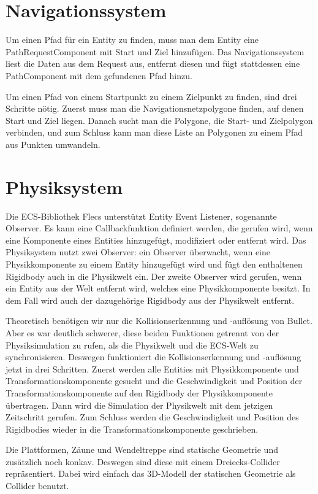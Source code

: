 \section{Navigationssystem}

Um einen Pfad für ein Entity zu finden, muss man dem Entity eine PathRequestComponent mit Start und Ziel hinzufügen. Das Navigationssystem liest die Daten aus dem Request aus, entfernt diesen und fügt stattdessen eine PathComponent mit dem gefundenen Pfad hinzu.

Um einen Pfad von einem Startpunkt zu einem Zielpunkt zu finden, sind drei Schritte nötig. Zuerst muss man die Navigationsnetzpolygone finden, auf denen Start und Ziel liegen. Danach sucht man die Polygone, die Start- und Zielpolygon verbinden, und zum Schluss kann man diese Liste an Polygonen zu einem Pfad aus Punkten umwandeln.

\section{Physiksystem}

Die ECS-Bibliothek Flecs unterstützt Entity Event Listener, sogenannte Observer. Es kann eine Callbackfunktion definiert werden, die gerufen wird, wenn eine Komponente eines Entities hinzugefügt, modifiziert oder entfernt wird. Das Physiksystem nutzt zwei Observer: ein Observer überwacht, wenn eine Physikkomponente zu einem Entity hinzugefügt wird und fügt den enthaltenen Rigidbody auch in die Physikwelt ein. Der zweite Observer wird gerufen, wenn ein Entity aus der Welt entfernt wird, welches eine Physikkomponente besitzt. In dem Fall wird auch der dazugehörige Rigidbody aus der Physikwelt entfernt.

Theoretisch benötigen wir nur die Kollisionserkennung und -auflösung von Bullet. Aber es war deutlich schwerer, diese beiden Funktionen getrennt von der Physiksimulation zu rufen, als die Physikwelt und die ECS-Welt zu synchronisieren. Deswegen funktioniert die Kollisionserkennung und -auflösung jetzt in drei Schritten. Zuerst werden alle Entities mit Physikkomponente und Transformationskomponente gesucht und die Geschwindigkeit und Position der Transformationskomponente auf den Rigidbody der Physikkomponente übertragen. Dann wird die Simulation der Physikwelt mit dem jetzigen Zeitschritt gerufen. Zum Schluss werden die Geschwindigkeit und Position des Rigidbodies wieder in die Transformationskomponente geschrieben.

Die Plattformen, Zäune und Wendeltreppe sind statische Geometrie und zusätzlich noch konkav. Deswegen sind diese mit einem Dreiecks-Collider repräsentiert. Dabei wird einfach das 3D-Modell der statischen Geometrie als Collider benutzt.

